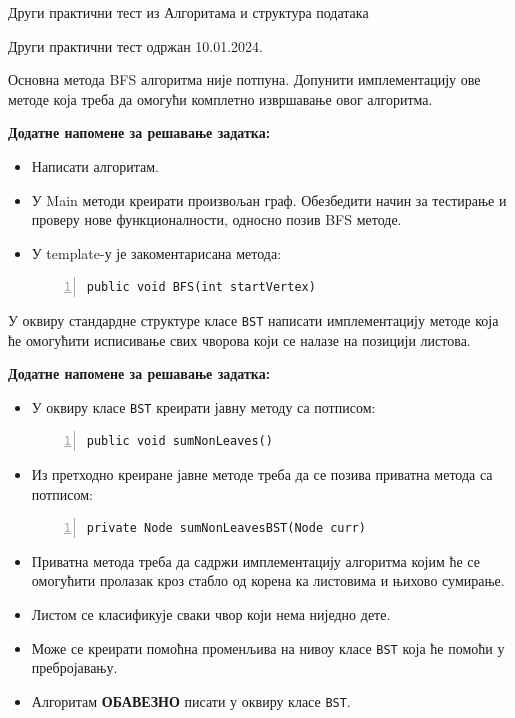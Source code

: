 
Други практични тест из Алгоритама и структура података

Други практични тест одржан 10.01.2024.

Основна метода BFS алгоритма није потпуна. Допунити имплементацију ове методе која треба да омогући комплетно извршавање овог алгоритма.

\textbf{Додатне напомене за решавање задатка:}
\begin{itemize}
	\item Написати алгоритам.
	\item У Main методи креирати произвољан граф. Обезбедити начин за тестирање и проверу нове функционалности, односно позив BFS методе.
	\item У template-у је закоментарисана метода:
	\begin{Verbatim}[fontsize=\footnotesize, numbers=left, xleftmargin=10mm]
public void BFS(int startVertex)
	\end{Verbatim}
\end{itemize}



У оквиру стандардне структуре класе \texttt{BST} написати имплементацију методе која ће омогућити исписивање свих чворова који се налазе на позицији листова.

\textbf{Додатне напомене за решавање задатка:}
\begin{itemize}
	\item У оквиру класе \texttt{BST} креирати јавну методу са потписом:
	\begin{Verbatim}[fontsize=\footnotesize, numbers=left, xleftmargin=10mm]
public void sumNonLeaves()
	\end{Verbatim}
	\item Из претходно креиране јавне методе треба да се позива приватна метода са потписом:
	\begin{Verbatim}[fontsize=\footnotesize, numbers=left, xleftmargin=10mm]
private Node sumNonLeavesBST(Node curr)
	\end{Verbatim}
	\item Приватна метода треба да садржи имплементацију алгоритма којим ће се омогућити пролазак кроз стабло од корена ка листовима и њихово сумирање.
	\item Листом се класификује сваки чвор који нема ниједно дете.
	\item Може се креирати помоћна променљива на нивоу класе \texttt{BST} која ће помоћи у пребројавању.
	\item Алгоритам \textbf{ОБАВЕЗНО} писати у оквиру класе \texttt{BST}.
\end{itemize}

